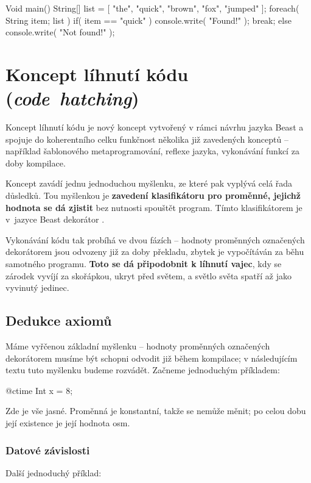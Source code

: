 \begin{code}
Void main() {
	String[] list = [ "the", "quick", "brown", "fox", "jumped" ];
	foreach( String item; list ) {
		if( item == "quick" )	{
			console.write( "Found!" );
			break;
		}
	} else
		console.write( "Not found!" );
}
\end{code}

\chapter{Koncept líhnutí kódu (\textit{code~hatching})} \label{chap:ctime}
Koncept líhnutí kódu je nový koncept vytvořený v rámci návrhu jazyka Beast a spojuje do koherentního celku funkčnost několika již zavedených konceptů -- například šablonového metaprogramování, reflexe jazyka, vykonávání funkcí za doby kompilace.

Koncept zavádí jednu jednoduchou myšlenku, ze které pak vyplývá celá řada důsledků. Tou myšlenkou je \textbf{zavedení klasifikátoru pro proměnné, jejichž hodnota se dá zjistit} bez nutnosti spouštět program. Tímto klasifikátorem je v~jazyce Beast dekorátor \ctime.

Vykonávání kódu tak probíhá ve dvou fázích -- hodnoty proměnných označených dekorátorem \ctime jsou odvozeny již za doby překladu, zbytek je vypočítáván za běhu samotného programu. \textbf{Toto se dá připodobnit k líhnutí vajec}, kdy se zárodek vyvíjí za skořápkou, ukryt před světem, a světlo světa spatří až jako vyvinutý jedinec.

\section{Dedukce axiomů}
Máme vyřčenou základní myšlenku -- hodnoty proměnných označených dekorátorem \ctime musíme být schopni odvodit již během kompilace; v následujícím textu tuto myšlenku budeme rozvádět. Začneme jednoduchým příkladem:

\begin{code}
@ctime Int x = 8;
\end{code}

Zde je vše jasné. Proměnná je konstantní, takže se nemůže měnit; po celou dobu její existence je její hodnota osm.

\subsection{Datové závislosti} \label{ctimeDataDependency}
Další jednoduchý příklad:


